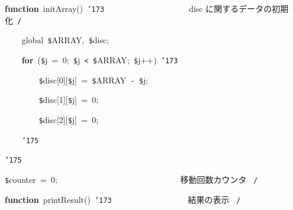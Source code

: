 \documentclass[a4paper,10pt]{article}
\def\mc{\relax}
\begin{document}
\noindent
\mbox{}\hfill

\noindent
\mbox{}\textbf{function}{\tt\mc \ }initArray(){\tt\mc \ }{\tt\char'173}{\tt\mc \ }{\tt\mc \ }{\tt\mc \ }{\tt\mc \ }{\tt\mc \ }{\tt\mc \ }{\tt\mc \ }{\tt\mc \ }{\tt\mc \ }{\tt\mc \ }{\tt\mc \ }{\tt\mc \ }{\tt\mc \ }{\tt\mc \ }{\tt\mc \ }{\tt\mc \ }{\tt\mc \ }{\tt\mc \ }\rm\mc {\tt /}{\tt *}\  \ disc に関するデータの初期化\hfill \rm\mc \ {\tt *}{\tt /}
\tt\mc 

\noindent
\mbox{}{\tt\mc \ }{\tt\mc \ }{\tt\mc \ }{\tt\mc \ }global{\tt\mc \ }{\tt\$}ARRAY,{\tt\mc \ }{\tt\$}disc;

\noindent
\mbox{}{\tt\mc \ }{\tt\mc \ }{\tt\mc \ }{\tt\mc \ }\textbf{for}{\tt\mc \ }({\tt\$}j{\tt\mc \ }={\tt\mc \ }0;{\tt\mc \ }{\tt\$}j{\tt\mc \ }{\tt <}{\tt\mc \ }{\tt\$}ARRAY;{\tt\mc \ }{\tt\$}j++){\tt\mc \ }{\tt\char'173}

\noindent
\mbox{}{\tt\mc \ }{\tt\mc \ }{\tt\mc \ }{\tt\mc \ }{\tt\mc \ }{\tt\mc \ }{\tt\mc \ }{\tt\mc \ }{\tt\$}disc[0][{\tt\$}j]{\tt\mc \ }={\tt\mc \ }{\tt\$}ARRAY{\tt\mc \ }{\tt -}{\tt\mc \ }{\tt\$}j;

\noindent
\mbox{}{\tt\mc \ }{\tt\mc \ }{\tt\mc \ }{\tt\mc \ }{\tt\mc \ }{\tt\mc \ }{\tt\mc \ }{\tt\mc \ }{\tt\$}disc[1][{\tt\$}j]{\tt\mc \ }={\tt\mc \ }0;

\noindent
\mbox{}{\tt\mc \ }{\tt\mc \ }{\tt\mc \ }{\tt\mc \ }{\tt\mc \ }{\tt\mc \ }{\tt\mc \ }{\tt\mc \ }{\tt\$}disc[2][{\tt\$}j]{\tt\mc \ }={\tt\mc \ }0;

\noindent
\mbox{}{\tt\mc \ }{\tt\mc \ }{\tt\mc \ }{\tt\mc \ }{\tt\char'175}

\noindent
\mbox{}{\tt\char'175}

\noindent
\mbox{}\hfill

\noindent
\mbox{}{\tt\$}counter{\tt\mc \ }={\tt\mc \ }0;{\tt\mc \ }{\tt\mc \ }{\tt\mc \ }{\tt\mc \ }{\tt\mc \ }{\tt\mc \ }{\tt\mc \ }{\tt\mc \ }{\tt\mc \ }{\tt\mc \ }{\tt\mc \ }{\tt\mc \ }{\tt\mc \ }{\tt\mc \ }{\tt\mc \ }{\tt\mc \ }{\tt\mc \ }{\tt\mc \ }{\tt\mc \ }{\tt\mc \ }{\tt\mc \ }{\tt\mc \ }{\tt\mc \ }{\tt\mc \ }{\tt\mc \ }{\tt\mc \ }{\tt\mc \ }\rm\mc {\tt /}{\tt *}\  \ 移動回数カウンタ \hfill \rm\mc \ {\tt *}{\tt /}
\tt\mc 

\noindent
\mbox{}\hfill

\noindent
\mbox{}\textbf{function}{\tt\mc \ }printResult(){\tt\mc \ }{\tt\char'173}{\tt\mc \ }{\tt\mc \ }{\tt\mc \ }{\tt\mc \ }{\tt\mc \ }{\tt\mc \ }{\tt\mc \ }{\tt\mc \ }{\tt\mc \ }{\tt\mc \ }{\tt\mc \ }{\tt\mc \ }{\tt\mc \ }{\tt\mc \ }{\tt\mc \ }{\tt\mc \ }\rm\mc {\tt /}{\tt *}\  \ 結果の表示 \hfill \rm\mc \ {\tt *}{\tt /}
\tt\mc 
\end{document}
